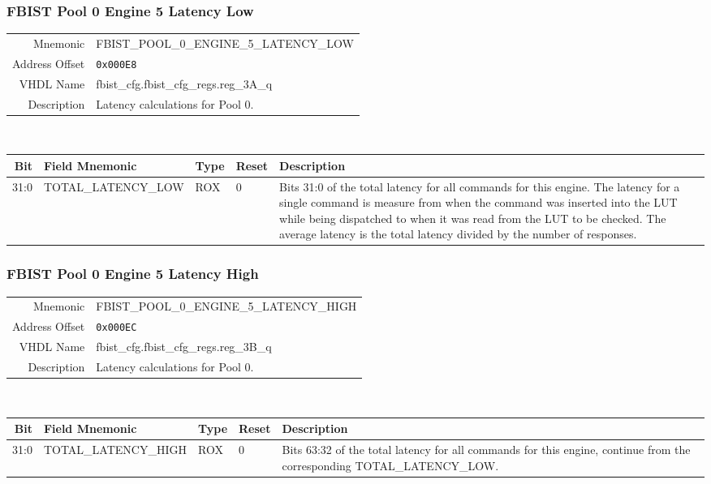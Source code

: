 \subsubsection{FBIST Pool 0 Engine 5 Latency Low}
\begin{tabular}{ r | p{350px} }
  Mnemonic       & FBIST\_POOL\_0\_ENGINE\_5\_LATENCY\_LOW \\
  Address Offset & \texttt{0x000E8}                        \\
  VHDL Name      &  fbist\_cfg.fbist\_cfg\_regs.reg\_3A\_q \\ \hline

  Description &
  Latency calculations for Pool 0. \\
\end{tabular}
\\
\begin{tabularx}{\textwidth}{r|l|l|l|X}
  \hline
  Bit   & Field Mnemonic      & Type & Reset & Description \\ \hline

  31:0  & TOTAL\_LATENCY\_LOW & ROX  & 0     &

  Bits 31:0 of the total latency for all commands for this engine. The
  latency for a single command is measure from when the command was
  inserted into the LUT while being dispatched to when it was read
  from the LUT to be checked. The average latency is the total latency
  divided by the number of responses. \\
\end{tabularx}

\subsubsection{FBIST Pool 0 Engine 5 Latency High}
\begin{tabular}{ r | p{350px} }
  Mnemonic       & FBIST\_POOL\_0\_ENGINE\_5\_LATENCY\_HIGH \\
  Address Offset & \texttt{0x000EC}                         \\
  VHDL Name      &  fbist\_cfg.fbist\_cfg\_regs.reg\_3B\_q  \\ \hline

  Description &
  Latency calculations for Pool 0. \\
\end{tabular}
\\
\begin{tabularx}{\textwidth}{r|l|l|l|X}
  \hline
  Bit   & Field Mnemonic       & Type & Reset & Description \\ \hline

  31:0  & TOTAL\_LATENCY\_HIGH & ROX  & 0     &

  Bits 63:32 of the total latency for all commands for this engine,
  continue from the corresponding TOTAL\_LATENCY\_LOW. \\
\end{tabularx}

